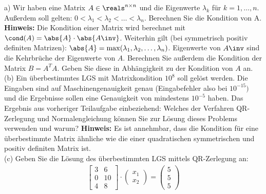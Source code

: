 \documentclass{scrartcl}
\begin{document}
	a)
	Wir haben eine  Matrix $A \in \reals^{n \times n}$ und die Eigenwerte $\lambda_k$ für $k=1, \dots, n$. 
	\n 
	Außerdem soll gelten: $0 < \lambda_1 < \lambda_2 < \dots < \lambda_n$.
	\n 
	Berechnen Sie die Kondition von A. \\
	\textbf{Hinweis:} Die Kondition einer Matrix wird berechnet mit $\cond(A) = \abs{A} \cdot \abs{A\inv}$. Weiterhin gilt (bei symmetrisch positiv definiten Matrizen): $\abs{A} = \max(\lambda_1, \lambda_2, \dots, \lambda_n)$. Eigenwerte von $A\inv$ sind die Kehrbrüche der Eigenwerte von $A$.
	\n
	Berechnen Sie außerdem die Kondition der Matrix $B= A^TA$. Geben Sie diese in Abhängigkeit zu der Kondition von $A$ an.
	\lbreak
	\\
	(b)
	Ein überbestimmtes LGS mit Matrixkondition $10^8$ soll gelöst werden. Die Eingaben sind auf Maschinengenauigkeit genau (Eingabefehler also bei $10^{-15})$ und die Ergebnisse sollen eine Genauigkeit von mindestens $10^{-5}$ haben.
	\n 
	Das Ergebnis aus vorheriger Teilaufgabe einbeziehend: Welches der Verfahren QR-Zerlegung und Normalengleichung können Sie zur Lösung dieses Problems verwenden und warum?
	\n 
	\textbf{Hinweis:} Es ist annehmbar, dass die Kondition für eine überbestimmte Matrix ähnliche wie die einer quadratischen symmetrischen und positiv definiten Matrix ist.
	\lbreak
	\\
	(c) 
	Geben Sie die Lösung des überbestimmten LGS mittels QR-Zerlegung an:
	\begin{align*}
		\begin{bmatrix}
			3 & 6\\
			0 & 10\\
			4 & 8
		\end{bmatrix} \cdot
		\begin{pmatrix}
			x_1 \\
			x_2 
		\end{pmatrix} = 
		\begin{pmatrix}
			5 \\ 5 \\ 5
		\end{pmatrix}
	\end{align*}
\end{document}
